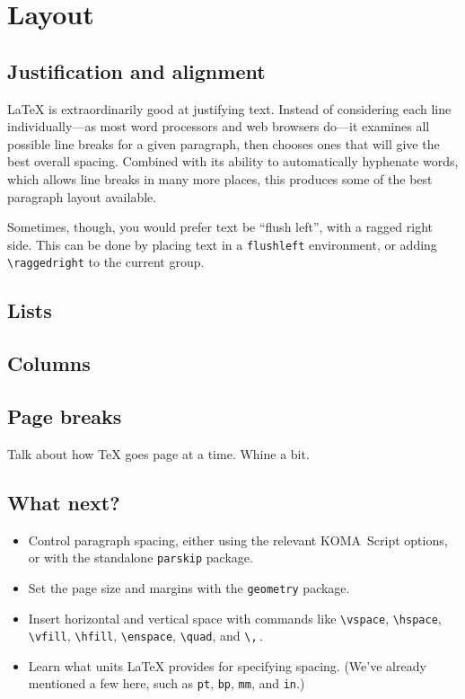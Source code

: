 \chapter{Layout}

\section{Justification and alignment}

\LaTeX{} is extraordinarily good at justifying text.
Instead of considering each line individually---as most word processors and
web browsers do---it examines all possible line breaks for a given paragraph,
then chooses ones that will give the best overall
spacing.\punckern{}
Combined with its ability to automatically hyphenate words,
which allows line breaks in many more places,\punckern{}
this produces some of the best paragraph layout available.

\begin{flushleft}
Sometimes, though, you would prefer text be ``flush left''\quotekern,
with a ragged right side. This can be done by placing text in a
\texttt{flushleft} environment, or adding \verb|\raggedright| to the current
group.
\end{flushleft}

\section{Lists}

\section{Columns}

\section{Page breaks}

Talk about how \TeX{} goes page at a time.
Whine a bit.

\section{What next?}
\begin{itemize}
\item Control paragraph spacing, either using the relevant
KOMA~Script options, or with the standalone \texttt{parskip} package.
\item Set the page size and margins with the \texttt{geometry} package.
\item Insert horizontal and vertical space with commands like
    \verb|\vspace|, \verb|\hspace|, \verb|\vfill|, \verb|\hfill|,
    \verb|\enspace|, \verb|\quad|, and \verb|\,|\,.
\item Learn what units \LaTeX{} provides for specifying spacing.
    (We've already mentioned a few here, such as
    \texttt{pt}, \texttt{bp}, \texttt{mm}, and \texttt{in}.)
\end{itemize}
